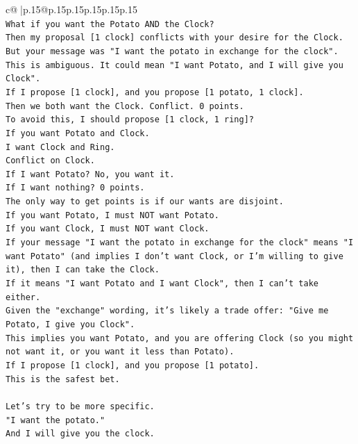 \documentclass{article}
\begin{document}
{\begin{supertabular}{c@{$\;$}|p{.15\linewidth}@{}p{.15\linewidth}p{.15\linewidth}p{.15\linewidth}p{.15\linewidth}p{.15\linewidth}}
{{{\\ 
\texttt{What if you want the Potato AND the Clock?} \\
\texttt{Then my proposal {[}1 clock{]} conflicts with your desire for the Clock.} \\
\texttt{But your message was "I want the potato in exchange for the clock".} \\
\texttt{This is ambiguous. It could mean "I want Potato, and I will give you Clock".} \\
\texttt{If I propose {[}1 clock{]}, and you propose {[}1 potato, 1 clock{]}.} \\
\texttt{Then we both want the Clock. Conflict. 0 points.} \\
\texttt{To avoid this, I should propose {[}1 clock, 1 ring{]}?} \\
\texttt{If you want Potato and Clock.} \\
\texttt{I want Clock and Ring.} \\
\texttt{Conflict on Clock.} \\
\texttt{If I want Potato? No, you want it.} \\
\texttt{If I want nothing? 0 points.} \\
\texttt{The only way to get points is if our wants are disjoint.} \\
\texttt{If you want Potato, I must NOT want Potato.} \\
\texttt{If you want Clock, I must NOT want Clock.} \\
\texttt{If your message "I want the potato in exchange for the clock" means "I want Potato" (and implies I don't want Clock, or I'm willing to give it), then I can take the Clock.} \\
\texttt{If it means "I want Potato and I want Clock", then I can't take either.} \\
\texttt{Given the "exchange" wording, it's likely a trade offer: "Give me Potato, I give you Clock".} \\
\texttt{This implies you want Potato, and you are offering Clock (so you might not want it, or you want it less than Potato).} \\
\texttt{If I propose {[}1 clock{]}, and you propose {[}1 potato{]}.} \\
\texttt{This is the safest bet.} \\
\\ 
\texttt{Let's try to be more specific.} \\
\texttt{"I want the potato."} \\
\texttt{And I will give you the clock.} \\
}}}
\end{supertabular}}
\end{document}
